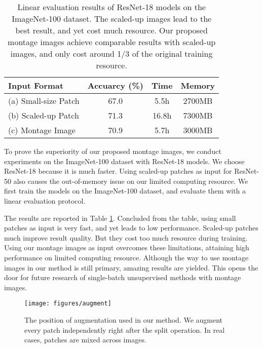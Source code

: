 \documentclass[final]{cvpr}
\begin{document}
\begin{table}
	\centering
	\begin{tabular} {l | c c c}
		\toprule
		Input Format & Accuarcy (\%) & Time & Memory \\
		\midrule
		(a) Small-size Patch & 67.0 & 5.5h & 2700MB \\
		(b) Scaled-up Patch & 71.3 & 16.8h & 7300MB \\
		(c) Montage Image & 70.9 & 5.7h & 3000MB \\
		\bottomrule
	\end{tabular}
	\vspace{0.1in}
	\caption{Linear evaluation results of ResNet-18 models on the ImageNet-100 dataset. The scaled-up images lead to the best result, and yet cost much resource. Our proposed montage images achieve comparable results with scaled-up images, and only cost around 1/3 of the original training resource.}
	\label{tab:montage}
\end{table}

To prove the superiority of our proposed montage images, we conduct experiments on the ImageNet-100 dataset with ResNet-18 models. We choose ResNet-18 because it is much faster. Using scaled-up patches as input for ResNet-50 also causes the out-of-memory issue on our limited computing resource. We first train the models on the ImageNet-100 dataset, and evaluate them with a linear evaluation protocol. 

The results are reported in Table \ref{tab:montage}. 
Concluded from the table, using small patches as input is very fast, and yet leads to low performance. Scaled-up patches much improve result quality. But they cost too much resource during training. Using our montage images as input overcomes these limitations, attaining high performance on limited computing resource. Although the way to use montage images in our method is still primary, amazing results are yielded. This opens the door for future research of single-batch unsupervised methods with montage images.
 
\begin{figure}
	\centering
	\texttt{[image: figures/augment]}
	\caption{The position of augmentation used in our method. We augment every patch independently right after the split operation. In real cases, patches are mixed across images.}
	\label{fig:augment}
\end{figure}
\end{document}
